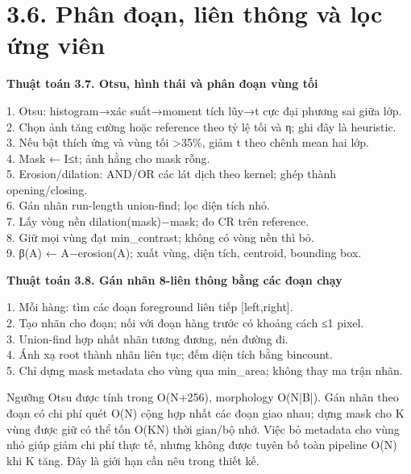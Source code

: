 \documentclass[13pt,a4paper]{extreport}
\begin{document}
\section*{3.6. Phân đoạn, liên thông và lọc ứng viên}
\textbf{Thuật toán 3.7. Otsu, hình thái và phân đoạn vùng tối}
\begin{flushleft}
1. Otsu: histogram→xác suất→moment tích lũy→t cực đại phương sai giữa lớp.\\
2. Chọn ảnh tăng cường hoặc reference theo tỷ lệ tối và η; ghi đây là heuristic.\\
3. Nếu bật thích ứng và vùng tối >35\%, giảm t theo chênh mean hai lớp.\\
4. Mask ← I≤t; ảnh hằng cho mask rỗng.\\
5. Erosion/dilation: AND/OR các lát dịch theo kernel; ghép thành opening/closing.\\
6. Gán nhãn run-length union-find; lọc diện tích nhỏ.\\
7. Lấy vòng nền dilation(mask)−mask; đo CR trên reference.\\
8. Giữ mọi vùng đạt min\_contrast; không có vòng nền thì bỏ.\\
9. β(A) ← A−erosion(A); xuất vùng, diện tích, centroid, bounding box.\\
\end{flushleft}
\textbf{Thuật toán 3.8. Gán nhãn 8-liên thông bằng các đoạn chạy}
\begin{flushleft}
1. Mỗi hàng: tìm các đoạn foreground liên tiếp [left,right].\\
2. Tạo nhãn cho đoạn; nối với đoạn hàng trước có khoảng cách ≤1 pixel.\\
3. Union-find hợp nhất nhãn tương đương, nén đường đi.\\
4. Ánh xạ root thành nhãn liên tục; đếm diện tích bằng bincount.\\
5. Chỉ dựng mask metadata cho vùng qua min\_area; không thay ma trận nhãn.\\
\end{flushleft}
Ngưỡng Otsu được tính trong O(N+256), morphology O(N|B|). Gán nhãn theo đoạn có chi phí quét O(N) cộng hợp nhất các đoạn giao nhau; dựng mask cho K vùng được giữ có thể tốn O(KN) thời gian/bộ nhớ. Việc bỏ metadata cho vùng nhỏ giúp giảm chi phí thực tế, nhưng không được tuyên bố toàn pipeline O(N) khi K tăng. Đây là giới hạn cần nêu trong thiết kế.
\par
\clearpage
\end{document}
